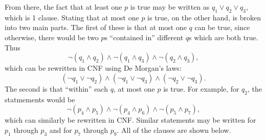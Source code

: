 \documentclass{article}
\begin{document}
From there, the fact that at least one $p$ is true
may be written as $q_1 \lor q_2 \lor q_3$,
which is 1 clause.
Stating that at most one $p$ is true,
on the other hand,
is broken into two main parts.
The first of these is that
at most one $q$ can be true,
since otherwise,
there would be two $p$s ``contained in'' different $q$s which are both true.
Thus
\[
\lnot (q_1 \land q_2) \land
\lnot (q_1 \land q_3) \land
\lnot (q_2 \land q_3),
\]
which can be rewritten in CNF using De Morgan's laws:
\[
(\lnot q_1 \lor \lnot q_2) \land
(\lnot q_1 \lor \lnot q_3) \land
(\lnot q_2 \lor \lnot q_3).
\]
The second is that ``within'' each $q$,
at most one $p$ is true.
For example, for $q_2$, the statmements would be
\[
\lnot (p_4 \land p_5) \land
\lnot (p_4 \land p_6) \land
\lnot (p_5 \land p_7),
\]
which can similarly be rewritten in CNF.
Similar statements may be written for $p_1$ through $p_3$
and for $p_7$ through $p_9$.
All of the clauses are shown below.

\end{document}
